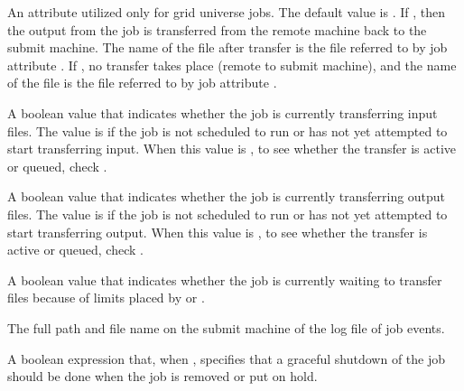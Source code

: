\begin{description}
\item[\AdAttr{TransferOut}:]   
An attribute utilized only for grid universe jobs.
The default value is .
If , then the output from the job
is transferred from the remote machine back to the submit machine.
The name of the file after transfer is the file referred to
by job attribute .
If , no transfer takes place (remote to submit machine),
and the name of the file is the file referred to
by job attribute .

\item[\AdAttr{TransferringInput}:]
A boolean value that indicates whether the job is currently
transferring input files.  The value is  if the job is
not scheduled to run or has not yet attempted to start transferring
input.  When this value is , to see whether the transfer is
active or queued, check .

\item[\AdAttr{TransferringOutput}:]
A boolean value that indicates whether the job is currently
transferring output files.  The value is  if the job
is not scheduled to run or has not yet attempted to start transferring
output.  When this value is , to see whether the transfer
is active or queued, check .

\item[\AdAttr{TransferQueued}:]

A boolean value that indicates whether the job is currently waiting to
transfer files because of limits placed by
 or
.

\item[\AdAttr{UserLog}:] The full path and file name on the submit machine
of the log file of job events.   

\item[\AdAttr{WantGracefulRemoval}:] A boolean expression that,
when , specifies that a graceful shutdown of the job
should be done when the job is removed or put on hold.


\end{description}
